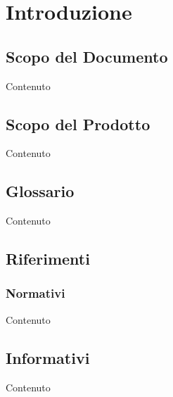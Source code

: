 \section{Introduzione}\label{Introduzione}

    \subsection{Scopo del Documento}
    Contenuto

    \subsection{Scopo del Prodotto}
    Contenuto

    \subsection{Glossario}
    Contenuto


    \subsection{Riferimenti}
    
    \subsubsection{Normativi}
    Contenuto

    \subsection{Informativi}
    Contenuto